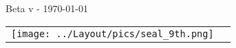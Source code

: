 
\setlength{\arrayrulewidth}{0.5pt}
\renewcommand{\arraystretch}{1.2}

\begin{titlepage}
\begin{center}

\ifdef{\booktitle}{}{\newcommand{\booktitle}{Missing title}}
\ifdef{\version}{}{\newcommand{\version}{Missing version}}

{\antiquefont\fontsize{40}{48}\selectfont\noindent{}

}

\vspace*{0.5cm}

\vspace*{-1cm}
{\antiquefont\fontsize{50}{60}\selectfont \booktitle
\vspace{0.4cm}

\fontsize{14}{16.8}\selectfont {}

Beta v\version{} - \today{}}

\vfill

\begin{tabular}{@{}m{2cm}@{\hskip 20pt}m{13cm}@{}}
\texttt{[image: ../Layout/pics/seal\_9th.png]} &
{\fontsize{10}{12}\selectfont \textcolor{black!50}{\noindent{}}}

\ifdef{\frontpageaddstuff}{{\fontsize{10}{12}\selectfont \noindent\textcolor{black!50}{\frontpageaddstuff}}}{}

\vspace*{10pt}
\noindent{\fontsize{10}{12}\selectfont \textcolor{black!50}{\labels@license}}
\tabularnewline
\end{tabular}


\end{center}

\newpage

\thispagestyle{empty}

{\fontsize{10}{12}\selectfont

\begin{center}\end{center}

}
\end{titlepage}
